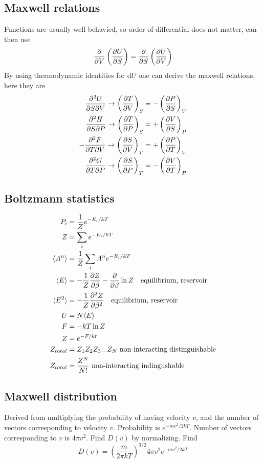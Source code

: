 \documentclass[a4paper, norsk, 8pt]{article}
\begin{document}
\begin{multicols*}{3}
\subsection*{\footnotesize  Maxwell relations}
Functions are usually well behavied, so order of differential does not matter, can then use
\begin{equation*}
    \pdv{}{V}\left( \pdv{U}{S} \right) = \pdv{}{S}\left( \pdv{U}{V} \right)
\end{equation*}
By using thermodynamic identities for d$U$ one can derive the maxwell relations, here they are
\begin{align*}
  \pdv{U}{S}{V} \rightarrow \left( \pdv{T}{V} \right)_S &= - \left( \pdv{P}{S} \right)_V \\
  \pdv{H}{S}{P} \rightarrow \left( \pdv{T}{P} \right)_S &= + \left( \pdv{V}{S} \right)_P \\
  -\pdv{F}{T}{V} \rightarrow \left( \pdv{S}{V} \right)_T &= + \left( \pdv{P}{T} \right)_V \\
  \pdv{G}{T}{P} \rightarrow \left( \pdv{S}{P} \right)_T &= - \left( \pdv{V}{T} \right)_P \\
\end{align*}

\subsection*{\footnotesize  Boltzmann statistics}
\begin{align*}
    P_i &= \frac{1}{Z}e^{-E_i/kT}\\
    Z &= \sum_{i} e^{-E_i/kT}    \\
    \langle A^n \rangle &= \frac{1}{Z}\sum_{i} A^n e^{-E_i/kT} \\
    \langle E \rangle &= -\frac{1}{Z}\pdv{Z}{\beta} -\pdv{}{\beta}\ln{Z}\quad \text{equilibrium, reservoir}\\
    \langle E^2 \rangle &= -\frac{1}{Z}\pdv[2]{Z}{\beta}\quad \text{equilibrium, reservoir}\\
    U &= N\langle E \rangle  \\
    F &= -kT\ln{Z} \\
    Z &= e^{-F/kt} \\
    Z_{total} &= Z_1Z_2Z_3...Z_N\,\, \text{non-interacting distinguishable}\\
    Z_{total} &= \frac{Z^N}{N!}\,\, \text{non-interacting indingushable}\\
\end{align*}

\subsection*{\footnotesize  Maxwell distribution}
Derived from multiplying the probability of having velocity $v$, and the number of vectors corresponding to velocity $v$. Probability is $e^{-mv^2/2kT}$. Number of vectors corresponding to $v$ is $4\pi v^2$. Find $D(v)$ by normalizing. Find
\begin{equation*}
    D(v) = \left(\frac{m}{2\pi k T}\right)^{3/2}4\pi v^2 e^{-mv^2/2kT}
\end{equation*}


\end{multicols*}
\end{document}
